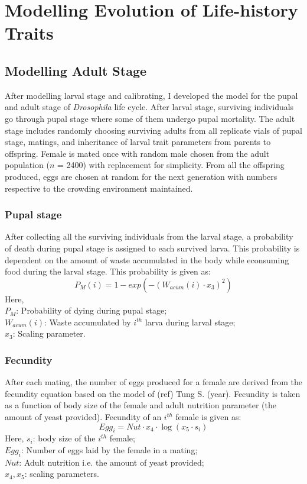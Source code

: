 \chapter{Modelling Evolution of Life-history Traits}

\section{Modelling Adult Stage}
After modelling larval stage and calibrating, I developed the model for the pupal and adult stage of \textit{Drosophila} life cycle. After larval stage, surviving individuals go through pupal stage where some of them undergo pupal mortality. The adult stage includes randomly choosing surviving adults from all replicate vials of pupal stage, matings, and inheritance of larval trait parameters from parents to offspring. Female is mated once with random male chosen from the adult population ($n$ = 2400) with replacement for simplicity. From all the offspring produced, eggs are chosen at random for the next generation with numbers respective to the crowding environment maintained.
\subsection{Pupal stage}
After collecting all the surviving individuals from the larval stage, a probability of death during pupal stage is assigned to each survived larva. This probability is dependent on the amount of waste accumulated in the body while econsuming food during the larval stage. This probability is given as:
\[P_{M}(i) = 1 - exp(-(W_{acum}(i) \cdot x_{3})^{2})\]
Here, \\
$P_{M}$: Probability of dying during pupal stage; \\
$W_{acum}(i)$: Waste accumulated by $i^{th}$ larva during larval stage; \\
$x_{3}$: Scaling parameter.
\subsection{Fecundity}
After each mating, the number of eggs produced for a female are derived from the fecundity equation based on the model of (ref) Tung S. (year). Fecundity is taken as a function of body size of the female and adult nutrition parameter (the amount of yeast provided). Fecundity of an $i^{th}$ female is given as:
\[Egg_{i} = Nut \cdot x_{4} \cdot \log{(x_{5} \cdot s_{i})}\]
Here, $s_{i}$: body size of the $i^{th}$ female; \\
$Egg_{i}$: Number of eggs laid by the female in a mating; \\
$Nut$: Adult nutrition i.e. the amount of yeast provided; \\
$x_{4}, x_{5}$: scaling parameters.
